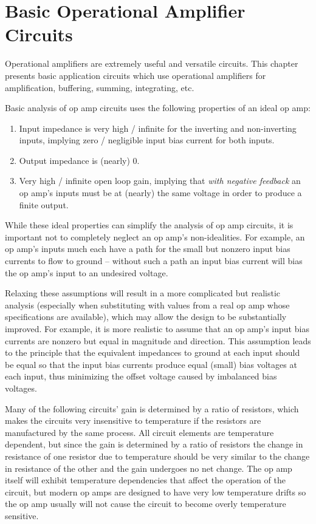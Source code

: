 \chapter{Basic Operational Amplifier Circuits}
Operational amplifiers are extremely useful and versatile circuits.
This chapter presents basic application circuits which use operational amplifiers for amplification, buffering, summing, integrating, etc.

Basic analysis of op amp circuits uses the following properties of an ideal op amp:

\begin{enumerate}
	\item Input impedance is very high / infinite for the inverting and non-inverting inputs, implying zero / negligible input bias current for both inputs.
	\item Output impedance is (nearly) 0.
	\item Very high / infinite open loop gain, implying that \emph{with negative feedback} an op amp's inputs must be at (nearly) the same voltage in order to produce a finite output.
\end{enumerate}

While these ideal properties can simplify the analysis of op amp circuits, it is important not to completely neglect an op amp's non-idealities.
For example, an op amp's inputs much each have a \DC path for the small but nonzero input bias currents to flow to ground -- without such a path an input bias current will bias the op amp's input to an undesired voltage.

Relaxing these assumptions will result in a more complicated but realistic analysis (especially when substituting with values from a real op amp whose specifications are available), which may allow the design to be substantially improved.
For example, it is more realistic to assume that an op amp's input bias currents are nonzero but equal in magnitude and direction.
This assumption leads to the principle that the equivalent impedances to ground at each input should be equal so that the input bias currents produce equal (small) bias voltages at each input, thus minimizing the offset voltage caused by imbalanced bias voltages.

Many of the following circuits' gain is determined by a ratio of resistors, which makes the circuits very insensitive to temperature if the resistors are manufactured by the same process.
All circuit elements are temperature dependent, but since the gain is determined by a ratio of resistors the change in resistance of one resistor due to temperature should be very similar to the change in resistance of the other and the gain undergoes no net change.
The op amp itself will exhibit temperature dependencies that affect the operation of the circuit, but modern op amps are designed to have very low temperature drifts so the op amp usually will not cause the circuit to become overly temperature sensitive.

